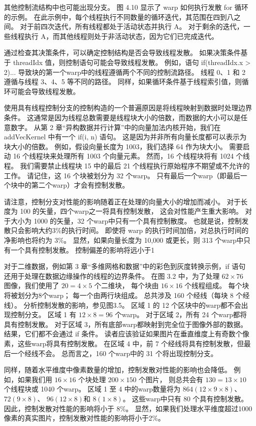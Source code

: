 其他控制流结构中也可能出现分支。 图 4.10 显示了 warp 如何执行发散 for 循环的示例。 
在此示例中，每个线程执行不同数量的循环迭代，其范围在四到八之间。 对于前四次迭代，所有线程都处于活动状态并执行 A。
对于剩余的迭代，一些线程执行 A，而其他线程则处于非活动状态，因为它们已完成迭代。

通过检查其决策条件，可以确定控制结构是否会导致线程发散。 如果决策条件基于 threadIdx 值，则控制语句可能会导致线程发散。 
例如，语句 if(threadIdx.x > 2){...} 导致块的第一个warp中的线程遵循两个不同的控制流路径。 
线程 0、1 和 2 遵循与线程 3、4、5 等不同的路径。 同样，如果循环条件基于线程索引值，则循环可能会导致线程发散。

使用具有线程控制分支的控制构造的一个普遍原因是将线程映射到数据时处理边界条件。 
这通常是因为线程总数需要是线程块大小的倍数，而数据的大小可以是任意数字。 
从第 2 章“异构数据并行计算”中的向量加法内核开始，我们在 addVecKernel 中有一个 if(i, n) 语句。 
这是因为并非所有向量长度都可以表示为块大小的倍数。 例如，假设向量长度为 1003，我们选择 64 作为块大小。 
需要启动 16 个线程块来处理所有 1003 个向量元素。 然而，16 个线程块将有 1024 个线程。 
我们需要禁止线程块 15 中的最后 21 个线程执行原始程序不期望或不允许的工作。 
请记住，这 16 个块被划分为 32 个warp。 只有最后一个warp（即最后一个块中的第二个warp）才会有控制发散。

请注意，控制分支对性能的影响随着正在处理的向量大小的增加而减小。 对于长度为 100 的矢量，四个warp之一将具有控制发散，
这会对性能产生重大影响。 对于大小为 1000 的矢量，32 个warp中只有一个具有控制散度。 
也就是说，控制发散只会影响大约3\%的执行时间。 即使将 warp 的执行时间加倍，对总执行时间的净影响也将约为 3\%。 
显然，如果向量长度为 10,000 或更长，则 313 个warp中只有一个具有控制发散。 控制偏差的影响将远小于1%

对于二维数据，例如第 3 章“多维网格和数据”中的彩色到灰度转换示例，if 语句还用于处理在数据边缘操作的线程的边界条件。 
在图 3.2 中，为了处理 $62 \times 76$ 图像，我们使用了 $20 = 4 \times 5$ 个二维块，
每个块由 $16 \times 16$ 个线程组成。 
每个块将被划分为8个warp； 每一个由两行块组成。 总共涉及 160 个经线（每块 8 个经线）。 分析控制发散的影响，参见图3.5。 
区域 1 的 12 个区块中的warp都不会出现控制分支。 区域 1 有 $12 \times 8 = 96$ 个warp。
对于区域 2，所有 24 个warp都将具有控制发散。 对于区域 3，所有底部warp都映射到完全位于图像外部的数据。 
结果，它们都不会通过 if 条件。 读者应该验证如果图片在垂直维度上有奇数个像素，这些warp将具有控制发散。 
在区域 4 中，前 7 个经线将具有控制发散，但最后一个经线不会。 总而言之，160 个warp中的 31 个将出现控制分支。

同样，随着水平维度中像素数量的增加，控制发散对性能的影响也会降低。 
例如，如果我们用 $16 \times 16$ 个块处理 $200 \times 150$ 个图片，
则总共会有 $130 = 13 \times 10$ 个线程块或 1040 个warp。 
区域 1 至 4 中的warp数量将为 $864(12 \times 9 \times 8)$、$72(9 \times 8)$、
$96 (12 \times 8)$和 $8(1 \times 8)$。 
这些warp中只有 80 个具有控制发散。 因此，控制发散对性能的影响将小于 8\%。 
显然，如果我们处理水平维度超过1000像素的真实图片，控制发散对性能的影响将小于2\%。

